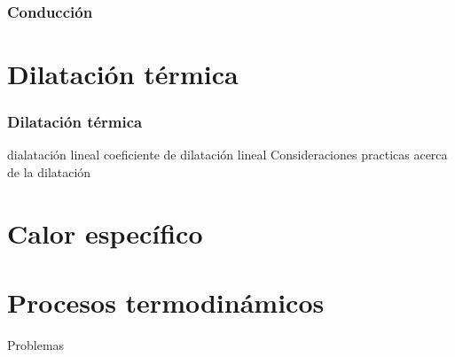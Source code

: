 \documentclass[handout]{beamer}
\begin{document}
\begin{frame}
  \frametitle{Conducción}
  
\end{frame}


  

  


  

\section{Dilatación térmica}

\begin{frame}
  \frametitle{Dilatación térmica}

  dialatación lineal
  coeficiente de dilatación lineal
  Consideraciones practicas acerca de la dilatación
\end{frame}


\section{Calor específico}


\section{Procesos termodinámicos}


Problemas
\end{document}
